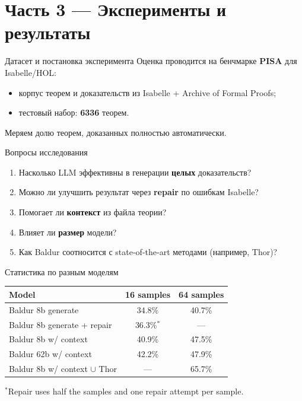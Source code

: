 \section{Часть 3 — Эксперименты и результаты}

\begin{frame}{Датасет и постановка эксперимента}
Оценка проводится на бенчмарке \textbf{PISA} для Isabelle/HOL:
\begin{itemize}
  \item корпус теорем и доказательств из Isabelle + Archive of Formal Proofs;
  \item тестовый набор: \textbf{6336} теорем.
\end{itemize}

\vspace{2mm}
Меряем долю теорем, доказанных полностью автоматически.
\end{frame}

\begin{frame}{Вопросы исследования}
\begin{enumerate}
  \item Насколько LLM эффективны в генерации \textbf{целых} доказательств?
  \item Можно ли улучшить результат через \textbf{repair} по ошибкам Isabelle?
  \item Помогает ли \textbf{контекст} из файла теории?
  \item Влияет ли \textbf{размер} модели?
  \item Как Baldur соотносится с state-of-the-art методами (например, Thor)?
\end{enumerate}
\end{frame}




\begin{frame}{Статистика по разным моделям}
\centering
\small

\begin{tabular}{lcc}
\toprule
Model & 16 samples & 64 samples \\
\midrule
Baldur 8b generate & 34.8\% & 40.7\% \\
Baldur 8b generate + repair & 36.3\%$^{*}$ & --- \\
Baldur 8b w/ context & 40.9\% & 47.5\% \\
Baldur 62b w/ context & 42.2\% & 47.9\% \\
\midrule
Baldur 8b w/ context $\cup$ Thor & --- & 65.7\% \\
\bottomrule
\end{tabular}

\vspace{0.3cm}
{\tiny $^{*}$Repair uses half the samples and one repair attempt per sample.}
\end{frame}

